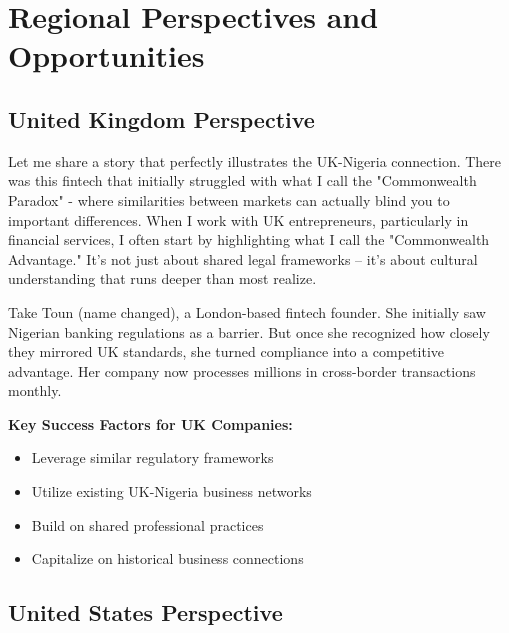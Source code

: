 \section{Regional Perspectives and Opportunities}

\subsection{United Kingdom Perspective}


Let me share a story that perfectly illustrates the UK-Nigeria connection. There was this fintech that initially struggled with what I call the "Commonwealth Paradox" - where similarities between markets can actually blind you to important differences.
When I work with UK entrepreneurs, particularly in financial services, I often start by highlighting what I call the "Commonwealth Advantage." It's not just about shared legal frameworks – it's about cultural understanding that runs deeper than most realize.

Take Toun (name changed), a London-based fintech founder. She initially saw Nigerian banking regulations as a barrier. But once she recognized how closely they mirrored UK standards, she turned compliance into a competitive advantage. Her company now processes millions in cross-border transactions monthly.

\textbf{Key Success Factors for UK Companies:}
\begin{itemize}
    \item Leverage similar regulatory frameworks
    \item Utilize existing UK-Nigeria business networks
    \item Build on shared professional practices
    \item Capitalize on historical business connections
\end{itemize}

\subsection{United States Perspective}

